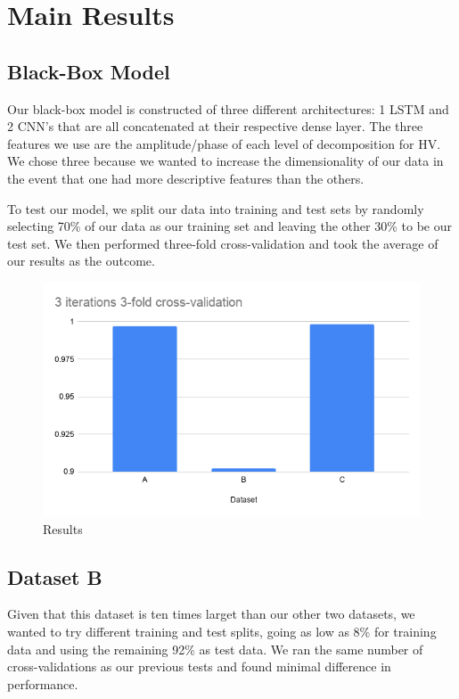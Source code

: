 \documentclass{turabian-thesis}
\begin{document}
\chapter{Main Results}
\label{chap:results}

\section{Black-Box Model}
Our black-box model is constructed of three different architectures: 1 LSTM and 2 CNN’s that are all concatenated at their respective dense layer. The three features we use are the amplitude/phase of each level of decomposition for HV. We chose three because we wanted to increase the dimensionality of our data in the event that one had more descriptive features than the others.

To test our model, we split our data into training and test sets by randomly selecting 70\% of our data as our training set and leaving the other 30\% to be our test set. We then performed three-fold cross-validation and took the average of our results as the outcome.

\begin{figure}[h!]
   \begin{center}
      \includegraphics[scale=0.6]{../media/results.png}
   \end{center}
   \caption{Results}
   \label{fig:final_results}
\end{figure}


\section{Dataset B}

Given that this dataset is ten times larget than our other two datasets, we wanted to try different training and test splits, going as low as 8\% for training data and using the remaining 92\% as test data. We ran the same number of cross-validations as our previous tests and found minimal difference in performance.
\end{document}
